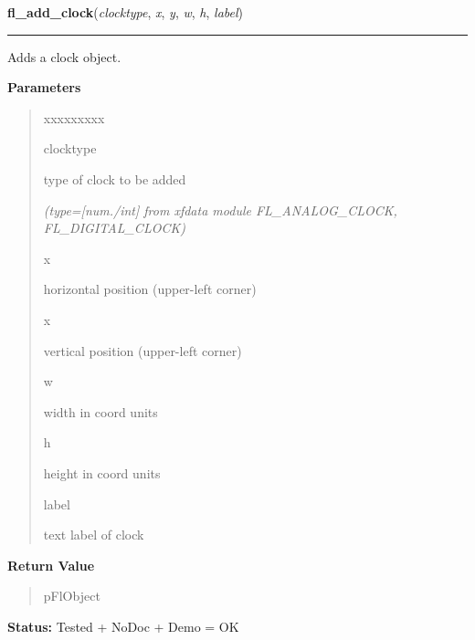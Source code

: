     \label{xformslib:flclock:fl_add_clock}

    \vspace{0.5ex}

\hspace{.8\funcindent}\begin{boxedminipage}{\funcwidth}

    \raggedright \textbf{fl\_add\_clock}(\textit{clocktype}, \textit{x}, \textit{y}, \textit{w}, \textit{h}, \textit{label})

    \vspace{-1.5ex}

    \rule{\textwidth}{0.5\fboxrule}
\setlength{\parskip}{2ex}
    Adds a clock object.

\setlength{\parskip}{1ex}
      \textbf{Parameters}
      \vspace{-1ex}

      \begin{quote}
        \begin{Ventry}{xxxxxxxxx}

          \item[clocktype]

          type of clock to be added

            {\it (type=[num./int] from xfdata module FL\_ANALOG\_CLOCK, FL\_DIGITAL\_CLOCK)}

          \item[x]

          horizontal position (upper-left corner)

          \item[x]

          vertical position (upper-left corner)

          \item[w]

          width in coord units

          \item[h]

          height in coord units

          \item[label]

          text label of clock

        \end{Ventry}

      \end{quote}

      \textbf{Return Value}
    \vspace{-1ex}

      \begin{quote}
      pFlObject

      \end{quote}

\textbf{Status:} Tested + NoDoc + Demo = OK



    \end{boxedminipage}

